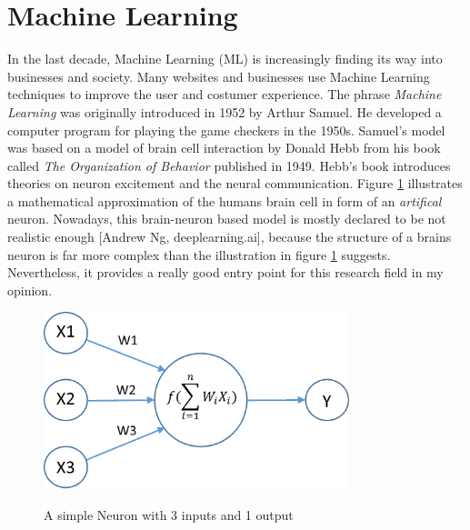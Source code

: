 \section{Machine Learning}
In the last decade, Machine Learning (ML) is increasingly finding its way into businesses and society. Many websites and businesses use Machine Learning techniques to improve the user and costumer experience. The phrase \textit{Machine Learning} was originally introduced in 1952 by Arthur Samuel. He developed a computer program for playing the game checkers in the 1950s. Samuel's model was based on a model of brain cell interaction by Donald Hebb from his book called \textit{The Organization of Behavior} published in 1949. Hebb's book introduces theories on neuron excitement and the neural communication. Figure \ref{neuron} illustrates a mathematical approximation of the humans brain cell in form of an \textit{artifical} neuron. Nowadays, this brain-neuron based model is mostly declared to be not realistic enough [Andrew Ng, deeplearning.ai], because the structure of a brains neuron is far more complex than the illustration in figure \ref{neuron} suggests. Nevertheless, it provides a really good entry point for this research field in my opinion. 

\begin{figure}
  \begin{center}
  \includegraphics[width=3.5in]{photos/neuron}\\
  \caption{A simple Neuron with 3 inputs and 1 output \cite{neuron}}\label{neuron}
  \end{center}
\end{figure}
 
